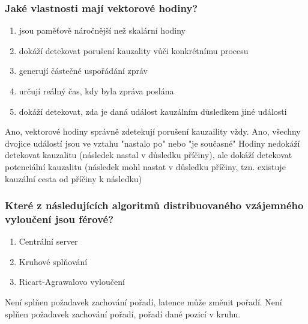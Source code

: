 \documentclass[usenames,dvipsnames,9pt]{beamer}
\begin{document}
{
  \begin{frame}[fragile]
  \frametitle{Jaké vlastnosti mají vektorové hodiny?}
  \begin{enumerate}
  \item jsou paměťově náročnější než skal\'arn\'i hodiny 
  \item dokáží detekovat porušení kauzality vůči konkrétnímu procesu 
  \item generují částečné uspořádání zpráv 
  \item určují reálný čas, kdy byla zpráva poslána 
  \item dokáží detekovat, zda je daná událost kauzálním důsledkem jiné události 
  \end{enumerate}
  \begin{overprint}[\textwidth]
     Ano, vektorové hodiny správně zdetekují porušení kauzaility vždy.
     Ano, všechny dvojice událostí jsou ve vztahu "nastalo po" nebo "je současné"
     Hodiny nedokáží detekovat kauzalitu (následek nastal v důsledku příčiny), ale dokáží detekovat potenciální kauzalitu (následek mohl nastat v důsledku příčiny, tzn. existuje kauzální cesta od příčiny k následku)
  \end{overprint}
  \end{frame}


  \begin{frame}[fragile]
  \frametitle{Které z následujících algoritmů distribuovaného vzájemného vyloučení jsou férové?}
  \begin{enumerate}
  \item Centrální server 
  \item Kruhové splňování 
  \item Ricart-Agrawalovo vyloučení 
  \end{enumerate}
  \vspace{2em}
  \begin{overprint}[\textwidth]
     Není splňen požadavek zachování pořadí, latence může změnit pořadí.
     Není splňen požadavek zachování pořadí, pořadí dané pozicí v kruhu.
  \end{overprint}
  \end{frame}


}
\end{document}
